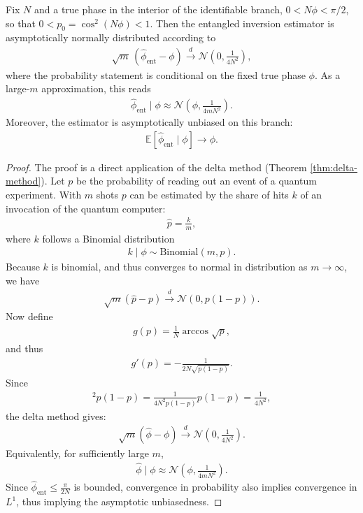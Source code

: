 \begin{lemma}\label{lemma:asymp-dist-est}
Fix $N$ and a true phase in the interior of the identifiable branch, $0<N\phi<\pi/2$, so that $0<p_0=\cos^2(N\phi)<1$.
Then the entangled inversion estimator is asymptotically normally distributed according to
\begin{align}
    \sqrt{m}\,(\hat\phi_\text{ent}-\phi) \xrightarrow{d} \mathcal N\!\left(0, \frac{1}{4N^2}\right),
\end{align}
where the probability statement is conditional on the fixed true phase $\phi$.
As a large-$m$ approximation, this reads
\begin{align}
    \hat\phi_\text{ent} \mid \phi \approx \mathcal N\!\left(\phi, \frac{1}{4mN^2}\right).
\end{align}
Moreover, the estimator is asymptotically unbiased on this branch:
\begin{align}
    \mathbb E[\hat \phi_\text{ent} \mid \phi] \rightarrow \phi.
\end{align}
\end{lemma}
\begin{proof}
    The proof is a direct application of the delta method (Theorem \ref{thm:delta-method}).
Let $p$ be the probability of reading out an event of a quantum experiment.
With $m$ shots $p$ can be estimated by the share of hits $k$ of an invocation of the quantum computer:
\begin{align}
    \hat p = \frac k m,
\end{align}
where $k$ follows a Binomial distribution \cite{cramer1946mathematical}
\begin{align}
    k \mid \phi \sim \text{Binomial}(m, p).
\end{align}
Because $k$ is binomial, and thus converges to normal in distribution as $m\to \infty$, we have
\begin{align}
\sqrt m (\hat p - p) \xrightarrow{d} \mathcal N(0, p(1-p)).
\end{align}
Now define
\begin{align}
    g(p) = \frac 1 N \arccos \sqrt p,
\end{align}
and thus
\begin{align}
    g'(p) = -\frac{1}{2N\sqrt{p(1-p)}}.
\end{align}
Since
\begin{align}
[g'(p)]^2p(1-p) = \frac{1}{4N^2p(1-p)} p(1-p) = \frac{1}{4N^2},
\end{align}
the delta method gives:
\begin{align}
\sqrt m (\hat\phi - \phi) \xrightarrow{d} \mathcal N\left(0, \frac{1}{4N^2}\right).
\end{align}
Equivalently, for sufficiently large $m$,
\begin{align}
\hat\phi \mid \phi \approx \mathcal N\left(\phi, \frac{1}{4mN^2}\right).
\end{align}
Since $\hat\phi_\text{ent}\leq \frac{\pi}{2N}$ is bounded, convergence in probability also implies convergence in $L^1$, thus implying
the asymptotic unbiasedness.
\end{proof}



